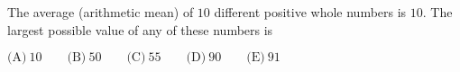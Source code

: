 

The average (arithmetic mean) of $10$ different positive whole numbers is $10$. The largest possible value of any of these numbers is

$\text{(A)}\ 10 \qquad \text{(B)}\ 50 \qquad \text{(C)}\ 55 \qquad \text{(D)}\ 90 \qquad \text{(E)}\ 91$

